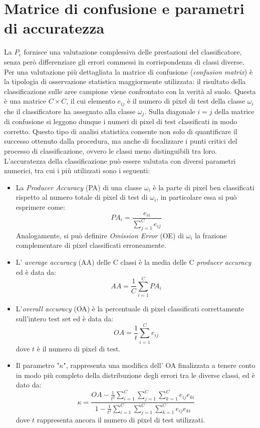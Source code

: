 \section{Matrice di confusione e parametri di accuratezza}
La $P_e$ fornisce una valutazione complessiva delle prestazioni del classificatore, senza però differenziare gli errori commessi in corrispondenza di classi diverse. Per una valutazione più dettagliata la matrice di confusione (\emph{confusion matrix}) è la tipologia di osservazione statistica maggiormente utilizzata: il risultato della classificazione sulle aree campione viene confrontato con la verità al suolo. Questa è una matrice $C \times C$, il cui elemento $e_{ij}$ è il numero di pixel di test della classe $\omega_i$ che il classificatore ha assegnato alla classe $\omega_j$. Sulla diagonale $i=j$ della matrice di confusione si leggono dunque i numeri di pixel di test classificati in modo corretto. Questo tipo di analisi statistica consente non solo di quantificare il successo ottenuto dalla procedura, ma anche di focalizzare i punti critici del processo di classificazione, ovvero le classi meno distinguibili tra loro. \\
L'accuratezza della classificazione può essere valutata con diversi parametri numerici, tra cui i più utilizzati sono i seguenti:
\begin{itemize}
\item La \emph{Producer Accuracy} (PA) di una classe $\omega_i$ è la
parte di pixel ben classificati rispetto al numero totale di
pixel di test di $\omega_i$, in particolare essa si può esprimere
come:
\begin{equation}
\label{eq:PA}
PA_i=\dfrac{e_{ii}}{\sum_{j=1}^Ce_{ij}}
\end{equation}
Analogamente, si può definire \emph{Omission Error} (OE) di $\omega_i$ la frazione complementare di pixel classificati erroneamente.
\item L' \emph{average accuracy} (AA) delle C classi è la media delle C \emph{producer accuracy} ed è data da:
\begin{equation}
\label{eq:AA}
AA=\dfrac{1}{C}\sum_{i=1}^C{PA_i}
\end{equation}
\item L'\emph{overall accuracy }(OA) è la percentuale di pixel classificati correttamente sull'intero test set ed è data da:
\begin{equation}
\label{eq:OA}
OA= \dfrac{1}{t}\sum_{i=1}^C e_{ij}
\end{equation}
dove $t$ è il numero di pixel di test.
\item Il parametro "$\kappa$", rappresenta una modifica dell' OA finalizzata a tenere conto in modo più completo della distribuzione degli errori tra le diverse classi, ed è dato da:
\begin{equation}
\label{eq:K}
\kappa=\dfrac{OA-\frac{1}{t^2}\sum_{i=1}^C\sum_{j=1}^C\sum_{k=1}^C e_{ij}e_{ki}}{1-\frac{1}{t^2}\sum_{i=1}^C\sum_{j=1}^C\sum_{k=1}^C e_{ij} e_{ki}}
\end{equation}
dove $t$ rappresenta ancora il numero di pixel di test utilizzati.
\end{itemize}


